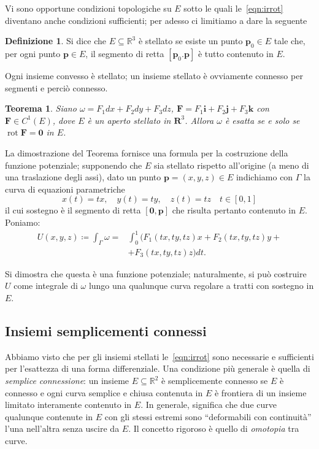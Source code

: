 \documentclass[a4paper]{book}
\DeclareMathOperator{\rot}{rot}
\numberwithin{equation}{section}
\theoremstyle{plain}
\newtheorem{teor}{Teorema}[section]
\theoremstyle{definition}
\newtheorem{defn}{Definizione}[section]
\theoremstyle{remark}
\renewcommand{\vec}{\boldsymbol}
\theoremstyle{example}
\begin{document}
Vi sono opportune condizioni topologiche su $E$ sotto le quali le~\eqref{eqn:irrot} diventano anche condizioni sufficienti; per adesso ci limitiamo a dare la seguente
	\begin{defn}
	Si dice che $E \subseteq \mathbb{R}^3$ è stellato se esiste un punto $\vec{p}_0 \in E$ tale che, per ogni punto $\vec{p} \in E$, il segmento di retta $[\vec{p}_0. \vec{p}]$ è tutto contenuto in $E$.
	\end{defn}

Ogni insieme convesso è stellato; un insieme stellato è ovviamente connesso per segmenti e perciò connesso. 

\begin{teor}
Siano $\omega = F_1dx + F_2 dy + F_3 dz$, $\vec{F} = F_1\vec{i} + F_2\vec{j} + F_3\vec{k}$ con $\vec{F} \in C^1(E)$, dove $E$ è un aperto stellato in $\vec{R}^3$. Allora $\omega$ è esatta se e solo se $\rot{\vec{F}} = \vec{0}$ in $E$.
\end{teor}

La dimostrazione del Teorema fornisce una formula per la costruzione della funzione potenziale; supponendo che $E$ sia stellato rispetto all'origine (a meno di una traslazione degli assi), dato un punto $\vec{p} = (x, y, z) \in E$ indichiamo con $\Gamma$ la curva di equazioni parametriche
	\begin{equation*}
	x(t) = tx, \quad y(t) = ty, \quad z(t) = tz \quad t \in [0, 1]
	\end{equation*}
il cui sostegno è il segmento di retta $[\vec{0}, \vec{p}]$ che risulta pertanto contenuto in $E$. Poniamo:
	\begin{equation}
	\begin{split}
	U(x, y, z) \coloneqq \int_{\Gamma}\omega = &\int_0^1 (F_1(tx, ty, tz)x + F_2(tx, ty, tz)y + \\
 &+F_3(tx, ty, tz)z) dt.
	\end{split}
	\end{equation}

Si dimostra che questa è una funzione potenziale; naturalmente, si può costruire $U$ come integrale di $\omega$ lungo una qualunque curva regolare a tratti con sostegno in $E$. 

\subsection{Insiemi semplicementi connessi}
Abbiamo visto che per gli insiemi stellati le~\eqref{eqn:irrot} sono necessarie e sufficienti per l'esattezza di una forma differenziale. Una condizione più generale è quella di \emph{semplice connessione}: un insieme $E \subseteq \mathbb{R}^2$ è semplicemente connesso se $E$ è connesso e ogni curva semplice e chiusa contenuta in $E$ è frontiera di un insieme limitato interamente contenuto in $E$. In generale, significa che due curve qualunque contenute in $E$ con gli stessi estremi sono ``deformabili con continuità''  l'una nell'altra senza uscire da $E$. Il concetto rigoroso è quello di \emph{omotopia} tra curve.
\end{document}
